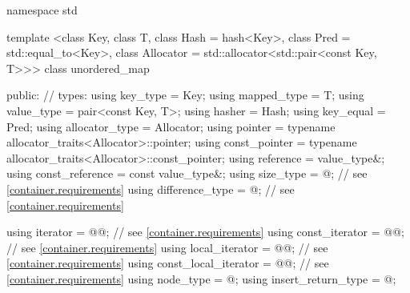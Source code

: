 %
\begin{codeblock}
namespace std {
  template <class Key,
            class T,
            class Hash = hash<Key>,
            class Pred = std::equal_to<Key>,
            class Allocator = std::allocator<std::pair<const Key, T>>>
  class unordered_map {
  public:
    // types:
    using key_type             = Key;
    using mapped_type          = T;
    using value_type           = pair<const Key, T>;
    using hasher               = Hash;
    using key_equal            = Pred;
    using allocator_type       = Allocator;
    using pointer              = typename allocator_traits<Allocator>::pointer;
    using const_pointer        = typename allocator_traits<Allocator>::const_pointer;
    using reference            = value_type&;
    using const_reference      = const value_type&;
    using size_type            = @\impdef@; // see \ref{container.requirements}
    using difference_type      = @\impdef@; // see \ref{container.requirements}

    using iterator             = @@; // see \ref{container.requirements}
    using const_iterator       = @@; // see \ref{container.requirements}
    using local_iterator       = @@; // see \ref{container.requirements}
    using const_local_iterator = @@; // see \ref{container.requirements}
    using node_type            = @\unspec@;
    using insert_return_type   = @\unspec@;

}}
\end{codeblock}
